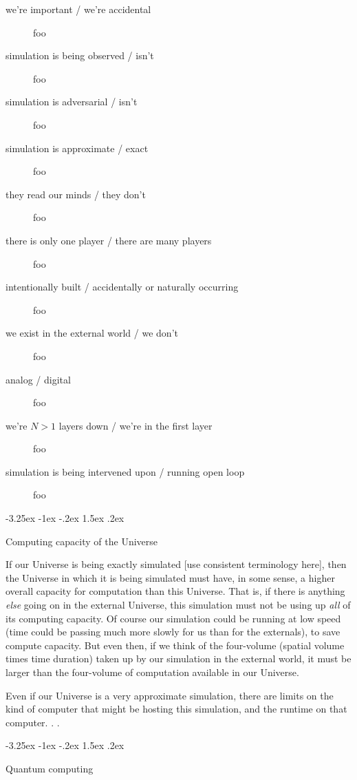 \documentclass[letterpaper]{article}
\makeatletter
\renewcommand\section{\@startsection {section}{1}{\z@}%
  {-3.25ex \@plus -1ex \@minus -.2ex}%
  {1.5ex \@plus .2ex}%
  {\raggedright\normalfont\large\bfseries}}
\makeatother
\begin{document}
\begin{description}
\item[we're important / we're accidental] foo
\item[simulation is being observed / isn't] foo
\item[simulation is adversarial / isn't] foo
\item[simulation is approximate / exact] foo
\item[they read our minds / they don't] foo
\item[there is only one player / there are many players] foo
\item[intentionally built / accidentally or naturally occurring] foo
\item[we exist in the external world / we don't] foo
\item[analog / digital] foo
\item[we're $N>1$ layers down / we're in the first layer] foo
\item[simulation is being intervened upon / running open loop] foo
\end{description}


\section{Computing capacity of the Universe}

If our Universe is being exactly simulated [use consistent terminology here], then the Universe in which it is being simulated must have, in some sense, a higher overall capacity for computation than this Universe.
That is, if there is anything \emph{else} going on in the external Universe, this simulation must not be using up \emph{all} of its computing capacity.
Of course our simulation could be running at low speed (time could be passing much more slowly for us than for the externals), to save compute capacity.
But even then, if we think of the four-volume (spatial volume times time duration) taken up by our simulation in the external world, it must be larger than the four-volume of computation available in our Universe.

Even if our Universe is a very approximate simulation, there are limits on the kind of computer that might be hosting this simulation, and the runtime on that computer. .  .


\section{Quantum computing}
\end{document}
